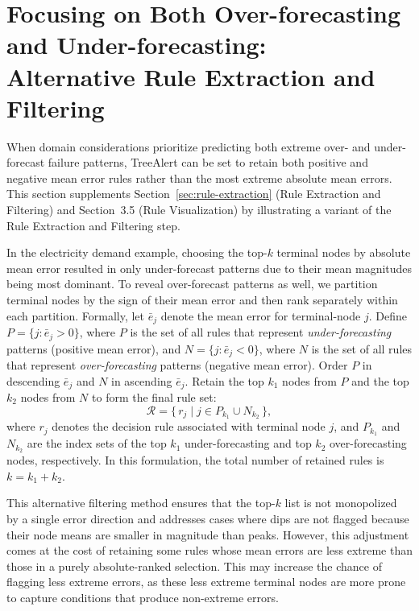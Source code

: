 \documentclass[preprint,12pt]{elsarticle}
\begin{document}
\clearpage

\appendix
\section{Focusing on Both Over-forecasting and Under-forecasting: \\ Alternative Rule Extraction and Filtering}
\label{append-A}

When domain considerations prioritize predicting both extreme over- and under-forecast failure patterns, TreeAlert can be set to retain both positive and negative mean error rules rather than the most extreme absolute mean errors. 
This section supplements Section~\ref{sec:rule-extraction} (Rule Extraction and Filtering) and Section~3.5 (Rule Visualization) by illustrating a variant of the Rule Extraction and Filtering step. 

In the electricity demand example, choosing the top-$k$ terminal nodes by absolute mean error resulted in only under-forecast patterns due to their mean magnitudes being most dominant. To reveal over-forecast patterns as well, we partition terminal nodes by the sign of their mean error and then rank separately within each partition. Formally, let $\bar e_j$ denote the mean error for terminal-node $j$. Define $P=\{j:\bar e_j>0\}$, where $P$ is the set of all rules that represent \textit{under-forecasting} patterns (positive mean error), and $N=\{j:\bar e_j<0\}$, where $N$ is the set of all rules that represent \textit{over-forecasting} patterns (negative mean error). Order $P$ in descending $\bar e_j$ and $N$ in ascending $\bar e_j$. Retain the top $k_1$ nodes from $P$ and the top $k_2$ nodes from $N$ to form the final rule set:
\begin{equation}
\mathcal{R} = \{\, r_j \;|\; j \in P_{k_1} \cup N_{k_2} \,\},
\end{equation}
where $r_j$ denotes the decision rule associated with terminal node $j$, and $P_{k_1}$ and $N_{k_2}$ are the index sets of the top $k_1$ under-forecasting and top $k_2$ over-forecasting nodes, respectively. In this formulation, the total number of retained rules is $k = k_1 + k_2$. 

This alternative filtering method ensures that the top-$k$ list is not monopolized by a single error direction and addresses cases where dips are not flagged because their node means are smaller in magnitude than peaks. However, this adjustment comes at the cost of retaining some rules whose mean errors are less extreme than those in a purely absolute-ranked selection. This may increase the chance of flagging less extreme errors, as these less extreme terminal nodes are more prone to capture conditions that produce non-extreme errors.
\end{document}
